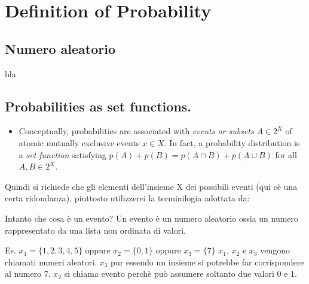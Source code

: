\chapter{Definition of Probability}

\section{Numero aleatorio}
bla

\section{Probabilities as set functions. \cite{rossi26102017}}
\begin{itemize}
 \item Conceptually, probabilities are associated with \emph{events or subsets} $A \in 2^X$ of atomic mutually exclusive events $x \in X$. 
       In fact, a probability distribution is a \emph{set function} satisfying $p(A)+p(B)=p(A \cap B) + p(A \cup B)$ for all $A,B \in 2^X$.
\end{itemize}

Quindi si richiede che gli elementi dell'insieme X dei possibili eventi (qui c\`e una certa ridondanza), piuttosto utilizzerei la terminilogia adottata da:

Intanto che cosa \`e un evento? Un evento \`e un numero aleatorio ossia un numero rappresentato da una lista non ordinata di valori.

Es. $x_1 = \{1,2,3,4,5\}$ oppure $x_2 = \{0,1\}$ oppure $x_3 = \{7\}$ $x_1$, $x_2$ e $x_3$ vengono chiamati numeri aleatori. $x_3$ pur essendo un insieme si potrebbe far corrispondere al numero $7$. $x_2$ si chiama evento perch\`e pu\`o assumere soltanto due valori $0$ e $1$.


